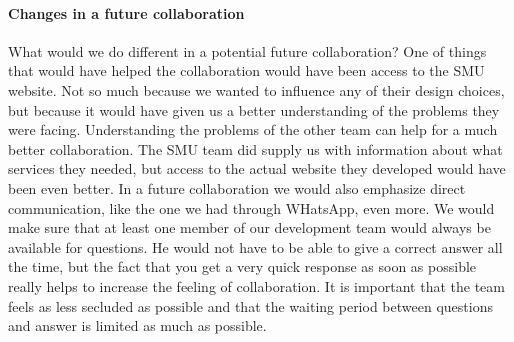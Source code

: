 \documentclass[a4paper,11pt,report]{article}
\begin{document}
\paragraph{Changes in a future collaboration}
What would we do different in a potential future collaboration? One of things that would have helped the collaboration would have been access to the SMU website. Not so much because we wanted to influence any of their design choices, but because it would have given us a better understanding of the problems they were facing. Understanding the problems of the other team can help for a much better collaboration. The SMU team did supply us with information about what services they needed, but access to the actual website they developed would have been even better. In a future collaboration we would also emphasize direct communication, like the one we had through WHatsApp, even more. We would make sure that at least one member of our development team would always be available for questions. He would not have to be able to give a correct answer all the time, but the fact that you get a very quick response as soon as possible really helps to increase the feeling of collaboration. It is important that the team feels as less secluded as possible and that the waiting period between questions and answer is limited as much as possible. 
\end{document}
